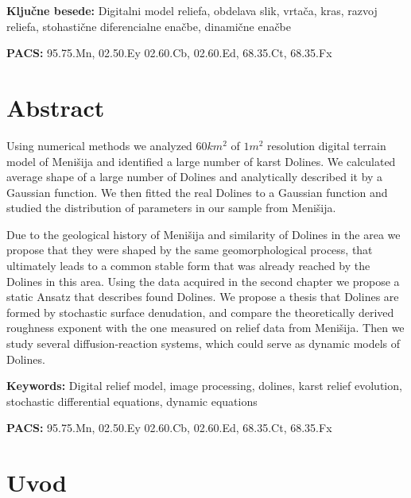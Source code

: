 \documentclass[a4paper, twoside, 12pt]{book}
\newcommand{\clearemptydoublepage}{\newpage{\pagestyle{empty}\cleardoublepage}}
\begin{document}
\vspace{1cm}

\noindent \textbf{Ključne besede:} Digitalni model reliefa, obdelava slik, vrtača, kras, razvoj reliefa, stohastične diferencialne enačbe, dinamične enačbe
\smallskip

\noindent \textbf{PACS:} 95.75.Mn, 02.50.Ey 02.60.Cb, 02.60.Ed, 68.35.Ct, 68.35.Fx
\clearemptydoublepage
{}

\chapter*{Abstract}

  Using numerical methods we analyzed $60 km^2$ of $1m^2$ resolution digital terrain model of Menišija and identified a large number of karst Dolines. We calculated average shape of a large number of Dolines and analytically described it by a Gaussian function. We then fitted the real Dolines to a Gaussian function and studied the distribution of parameters in our sample from Menišija.

  Due to the geological history of Menišija and similarity of Dolines in the area we propose that they were shaped by the same geomorphological process, that ultimately leads to a common stable form that was already reached by the Dolines in this area.
  Using the data acquired in the second chapter we propose a static Ansatz that describes found Dolines. We propose a thesis that Dolines are formed by stochastic surface denudation, and compare the theoretically derived roughness exponent with the one measured on relief data from Menišija. Then we study several diffusion-reaction systems, which could serve as dynamic models of Dolines.

\vspace{1cm}

\noindent \textbf{Keywords:} Digital relief model, image processing, dolines, karst relief evolution, stochastic differential equations, dynamic equations
\smallskip

\noindent \textbf{PACS:} 95.75.Mn, 02.50.Ey 02.60.Cb, 02.60.Ed, 68.35.Ct, 68.35.Fx
\clearemptydoublepage

\pagestyle{fancy}
\rhead{\thepage}

\tableofcontents{}
\clearemptydoublepage

\chapter{Uvod}
\label{ch:uvod}
\end{document}
